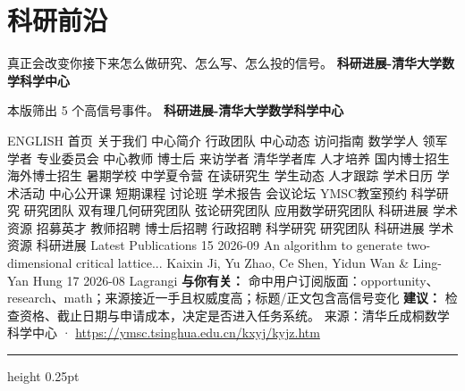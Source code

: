 \documentclass[10.5pt]{ctexart}
\begin{document}
\section*{科研前沿}
{\color{ormuted} 真正会改变你接下来怎么做研究、怎么写、怎么投的信号。}
\vspace{2mm}
{\LARGE\bfseries 科研进展-清华大学数学科学中心}\par
\vspace{1mm}
{\color{ormuted} 本版筛出 5 个高信号事件。}
\vspace{3mm}
{\Large\bfseries 科研进展-清华大学数学科学中心}\par
ENGLISH 首页 关于我们 中心简介 行政团队 中心动态 访问指南 数学学人 领军学者 专业委员会 中心教师 博士后 来访学者 清华学者库 人才培养 国内博士招生 海外博士招生 暑期学校 中学夏令营 在读研究生 学生动态 人才跟踪 学术日历 学术活动 中心公开课 短期课程 讨论班 学术报告 会议论坛 YMSC教室预约 科学研究 研究团队 双有理几何研究团队 弦论研究团队 应用数学研究团队 科研进展 学术资源 招募英才 教师招聘 博士后招聘 行政招聘 科学研究 研究团队 科研进展 学术资源 科研进展 Latest Publications 15 2026-09 An algorithm to generate two-dimensional critical lattice... Kaixin Ji, Yu Zhao, Ce Shen, Yidun Wan \& Ling-Yan Hung 17 2026-08 Lagrangi
\textbf{与你有关：} 命中用户订阅版面：opportunity、research、math；来源接近一手且权威度高；标题/正文包含高信号变化
\textbf{建议：} 检查资格、截止日期与申请成本，决定是否进入任务系统。
{\footnotesize\color{ormuted} 来源：清华丘成桐数学科学中心 · \url{https://ymsc.tsinghua.edu.cn/kxyj/kyjz.htm}}
\vspace{4mm}
\hrule height 0.25pt
\vspace{3mm}
\end{document}
